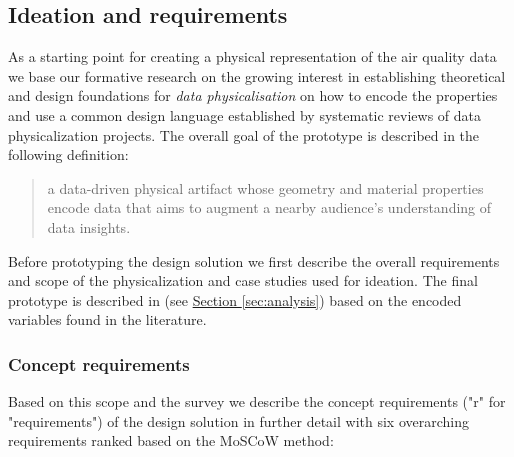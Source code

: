 \subsection{Ideation and requirements}

As a starting point for creating a physical representation of the air quality data we base our formative research on the growing interest in establishing theoretical and design foundations for \textit{data physicalisation} \cite{hornecker_design_2023, sauve_physecology_2022, bae_making_2022} on how to encode the properties and use a common design language \cite{ranasinghe_encoding_2023, sosa_data_2018} established by systematic reviews of data physicalization projects. The overall goal of the prototype is described in the following definition:

\begin{quote}
a data-driven physical artifact whose geometry and material properties encode data that aims to augment a nearby audience’s understanding of data insights.
\end{quote}

Before prototyping the design solution we first describe the overall requirements and scope of the physicalization and case studies used for ideation. The final prototype is described in (see \hyperref[sec:analysis]{Section \ref*{sec:analysis}}) based on the encoded variables found in the literature. 

\subsubsection{Concept requirements}

Based on this scope and the survey we describe the concept requirements ("r" for "requirements") of the design solution in further detail with six overarching requirements ranked based on the MoSCoW method:

